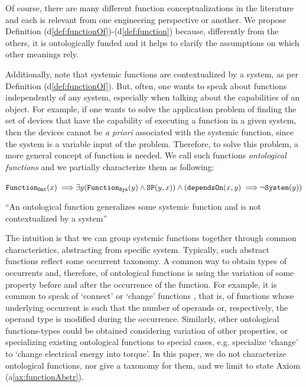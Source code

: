 \documentclass[sw]{iosart2x}
\newcommand{\bflist}{\begin{list}{}{\setlength{\topsep}{2mm}\setlength{\partopsep}{0mm}\setlength{\parsep}{0mm}\setlength{\leftmargin}{9mm}\setlength{\labelwidth}{8mm}}}
\newcommand{\eflist}{\end{list}}
\newcommand{\AxLabel}{\textrm{a}}
\newcommand{\DefLabel}{\textrm{d}}
\newcounter{cntax}
\newcommand{\myax}[1]{\refstepcounter{cntax}\begin{small}{\bf \AxLabel\thecntax\label{ax:#1}}\end{small}}
\newcommand{\mytext}[1]{``#1''}
\newcommand{\refax}[1]{({\AxLabel}\ref{#1})}
\newcommand{\refdf}[1]{({\DefLabel}\ref{#1})}
\newcommand{\generalStyle}[1]{\texttt{#1}}
\newcommand{\biRel}[3]{\generalStyle{#1}(#2,#3)}
\newcommand{\uniRel}[2]{\generalStyle{#1}(#2)}
\newcommand{\uniRelPar}[3]{\generalStyle{#1}_{\generalStyle{#3}}(#2)}
\newcommand{\myfi}{\hspace{0.9mm} \Longrightarrow}
\newcommand{\DOLCEConceptSubsum}[2]{\biRel{SP}{#1}{#2}}
\newcommand{\System}[1]{\uniRel{System}{#1}}
\newcommand{\FunctionSys}[1]{\uniRelPar{Function}{#1}{Sys}}
\newcommand{\FunctionAbs}[1]{\uniRelPar{Function}{#1}{Ont}}
\newcommand{\specificallyDependsOn}[2]{\biRel{dependsOn}{#1}{#2}}
\newcommand{\firstTimeKeyWord}[1]{\textit{#1}}
\newcommand{\TODO}[1]{{\color{red} #1}}
\begin{document}
Of course, there are many different function conceptualizations in the literature and each is relevant from one engineering perspective or another. We propose Definition \refdf{def:functionOf}-\refdf{def:function} because, differently from the others, it is ontologically funded and it helps to clarify the assumptions on which other meanings rely.

Additionally, note that systemic functions are contextualized by a system, as per Definition \refdf{def:functionOf}. But, often, one wants to speak about functions independently of any system, especially when talking about the capabilities of an object. For example, if one wants to solve the application problem of finding the set of devices that have the capability of executing a function in a given system, then the devices cannot be \textit{a priori} associated with the systemic function, since the system is a variable input of the problem.
Therefore, to solve this problem, a more general concept of function is needed. We call such functions \firstTimeKeyWord{ontological functions} and we partially characterize them as following:
\bflist
\item[\myax{functionAbstr}] $ \FunctionAbs{x} \myfi \exists y (\FunctionSys{y} \land \DOLCEConceptSubsum{y}{x}) \land (\specificallyDependsOn{x}{y} \myfi \neg \System{y}) $
\item[] \mytext{An ontological function generalizes some systemic function and is not contextualized by a system}
\eflist
The intuition is that we can group systemic functions together through common characteristics, abstracting from specific system.
Typically, such abstract functions reflect some occurrent taxonomy. 
A common way to obtain types of occurrents and, therefore, of ontological functions is using the variation of some property before and after the occurrence of the function. For example, it is common to speak of `connect' or `change' functions \cite{pahl_engineering_2007}, that is, of functions whose underlying occurrent is such that the number of operands or, respectively, the operand type is modified during the occurrence. Similarly, other ontological  functions-types could be obtained considering variation of other properties, or specializing existing ontological functions to special cases, e.g. specialize `change' to `change electrical energy into torque'.
In this paper, we do not characterize ontological functions, nor give a taxonomy for them, and we limit to state Axiom \refax{ax:functionAbstr}.
\end{document}
